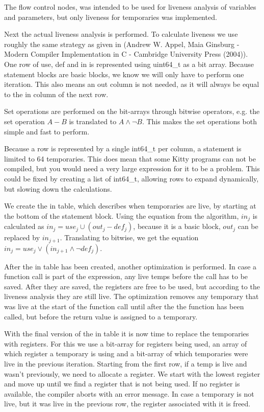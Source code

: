 \documentclass{article}
\begin{document}
The flow control nodes, was intended to be used for liveness analysis of variables and parameters, but only liveness for temporaries was implemented.


Next the actual liveness analysis is performed. To calculate liveness we use roughly the same strategy as given in (Andrew W. Appel, Maia Ginsburg - Modern Compiler Implementation in C - Cambridge University Press (2004)). One row of use, def and in is represented using uint64\_t as a bit array. Because statement blocks are basic blocks, we know we will only have to perform one iteration. This also means an out column is not needed, as it will always be equal to the in column of the next row. 

Set operations are performed on the bit-arrays through bitwise operators, e.g. the set operation $A - B$ is translated to $A \wedge \neg B$. This makes the set operations both simple and fast to perform. 

Because a row is represented by a single int64\_t per column, a statement is limited to 64 temporaries. This does mean that some Kitty programs can not be compiled, but you would need a very large expression for it to be a problem. This could be fixed by creating a list of int64\_t, allowing rows to expand dynamically, but slowing down the calculations. 


We create the in table, which describes when temporaries are live, by starting at the bottom of the statement block. Using the equation from the algorithm, $in_j$ is calculated as $in_j = use_j \cup (out_j - def_j)$, because it is a basic block, $out_j$ can be replaced by $in_{j + 1}$. Translating to bitwise, we get the equation $in_j = use_j \vee (in_{j + 1} \wedge \neg def_j)$. 

After the in table has been created, another optimization is performed. In case a function call is part of the expression, any live temps before the call has to be saved. After they are saved, the registers are free to be used, but according to the liveness analysis they are still live. The optimization removes any temporary that was live at the start of the function call until after the the function has been called, but before the return value is assigned to a temporary. 

With the final version of the in table it is now time to replace the temporaries with registers. For this we use a bit-array for registers being used, an array of which register a temporary is using and a bit-array of which temporaries were live in the previous iteration. Starting from the first row, if a temp is live and wasn't previously, we need to allocate a register. We start with the lowest register and move up until we find a register that is not being used. If no register is available, the compiler aborts with an error message. In case a temporary is not live, but it was live in the previous row, the register associated with it is freed.
\end{document}
